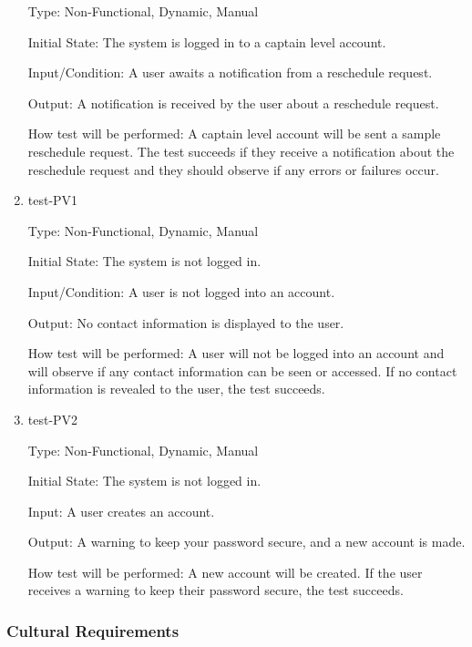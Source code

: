 \documentclass[12pt, titlepage]{article}
\begin{document}
\begin{enumerate}
  Type: Non-Functional, Dynamic, Manual

  Initial State: The system is logged in to a captain level account.

  Input/Condition: A user awaits a notification from a reschedule request.

  Output: A notification is received by the user about a reschedule request.

  How test will be performed: A captain level account will be sent a sample reschedule request.
  The test succeeds if they receive a notification about the reschedule request and they
  should observe if any errors or failures occur.

  \item{test-PV1\\}

  Type: Non-Functional, Dynamic, Manual

  Initial State: The system is not logged in.

  Input/Condition: A user is not logged into an account.

  Output: No contact information is displayed to the user.

  How test will be performed: A user will not be logged into an account and will
  observe if any contact information can be seen or accessed. If no contact information
  is revealed to the user, the test succeeds.

  \item{test-PV2\\}

  Type: Non-Functional, Dynamic, Manual

  Initial State: The system is not logged in.

  Input: A user creates an account.

  Output: A warning to keep your password secure, and a new account is made.

  How test will be performed: A new account will be created. If the user 
  receives a warning to keep their password secure, the test succeeds.

\end{enumerate}

\subsubsection{Cultural Requirements}
\end{document}
